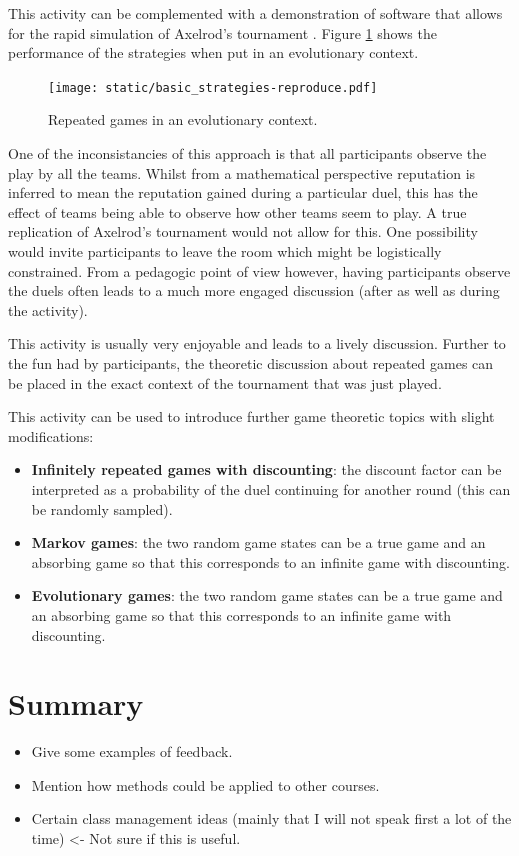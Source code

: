 \documentclass{article}
\begin{document}
This activity can be complemented with a demonstration of software that allows
for the rapid simulation of Axelrod's tournament
\cite{Axelrod-Pythonprojectteam2015}. Figure \ref{fig:evolutionary_axelrod}
shows the performance of the strategies when put in an evolutionary context.

\begin{figure}[!hbtp]
    \centering
    \texttt{[image: static/basic\_strategies-reproduce.pdf]}
    \caption{Repeated games in an evolutionary context.}
    \label{fig:evolutionary_axelrod}
\end{figure}

One of the inconsistancies of this approach is that all participants observe the
play by all the teams. Whilst from a mathematical perspective reputation is
inferred to mean the reputation gained during a particular duel, this has the
effect of teams being able to observe how other teams seem to play. A true
replication of Axelrod's tournament would not allow for this. One possibility
would invite participants to leave the room which might be logistically
constrained. From a pedagogic point of view however, having participants observe
the duels often leads to a much more engaged discussion (after as well as during
the activity).

This activity is usually very enjoyable and leads to a lively discussion.
Further to the fun had by participants, the theoretic discussion about repeated
games can be placed in the exact context of the tournament that was just played.

This activity can be used to introduce further game theoretic topics with
slight modifications:

\begin{itemize}
    \item \textbf{Infinitely repeated games with discounting}: the discount
        factor can be interpreted as a probability of the duel continuing for
        another round (this can be randomly sampled).
    \item \textbf{Markov games}: the two random game states can be a true game
        and an absorbing game so that this corresponds to an infinite game with
        discounting.
    \item \textbf{Evolutionary games}: the two random game states can be a true game
        and an absorbing game so that this corresponds to an infinite game with
        discounting.
\end{itemize}

\section{Summary}

\begin{itemize}
    \item Give some examples of feedback.
    \item Mention how methods could be applied to other courses.
    \item Certain class management ideas (mainly that I will not speak first a
        lot of the time) <- Not sure if this is useful.
\end{itemize}

\printbibliography
\end{document}
